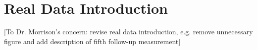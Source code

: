 \documentclass[12pt]{article}
\begin{document}
\section{Real Data Introduction}\label{sec:data}
[To Dr. Morrison's concern: revise real data introduction, e.g. remove unnecessary figure and add description of fifth follow-up measurement]
%
\end{document}
